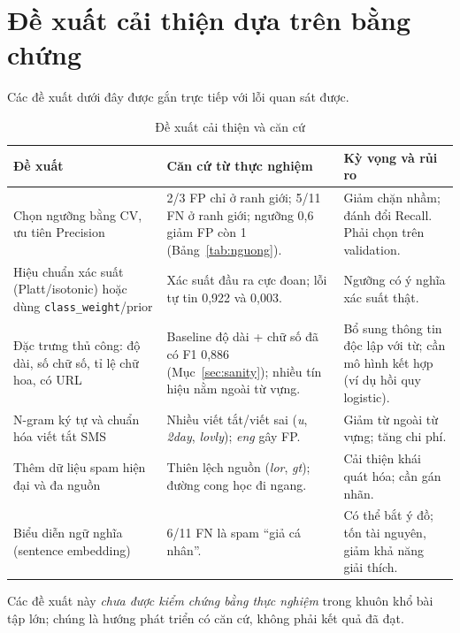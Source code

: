 \section{Đề xuất cải thiện dựa trên bằng chứng}

Các đề xuất dưới đây được gắn trực tiếp với lỗi quan sát được.

\begin{table}[H]
\centering
\caption{Đề xuất cải thiện và căn cứ}
\label{tab:de-xuat}
\small
\begin{tabular}{|p{3.7cm}|p{5.3cm}|p{5cm}|}
\hline
\textbf{Đề xuất} & \textbf{Căn cứ từ thực nghiệm} & \textbf{Kỳ vọng và rủi ro} \\
\hline
Chọn ngưỡng bằng CV, ưu tiên Precision & 2/3 FP chỉ ở ranh giới; 5/11 FN ở ranh giới; ngưỡng 0,6 giảm FP còn 1 (Bảng~\ref{tab:nguong}). & Giảm chặn nhầm; đánh đổi Recall. Phải chọn trên validation. \\
\hline
Hiệu chuẩn xác suất (Platt/isotonic) hoặc dùng \texttt{class\_weight}/prior & Xác suất đầu ra cực đoan; lỗi tự tin 0,922 và 0,003. & Ngưỡng có ý nghĩa xác suất thật. \\
\hline
Đặc trưng thủ công: độ dài, số chữ số, tỉ lệ chữ hoa, có URL & Baseline độ dài + chữ số đã có F1 0,886 (Mục~\ref{sec:sanity}); nhiều tín hiệu nằm ngoài từ vựng. & Bổ sung thông tin độc lập với từ; cần mô hình kết hợp (ví dụ hồi quy logistic). \\
\hline
N-gram ký tự và chuẩn hóa viết tắt SMS & Nhiều viết tắt/viết sai (\textit{u}, \textit{2day}, \textit{lovly}); \textit{eng} gây FP. & Giảm từ ngoài từ vựng; tăng chi phí. \\
\hline
Thêm dữ liệu spam hiện đại và đa nguồn & Thiên lệch nguồn (\textit{lor}, \textit{gt}); đường cong học đi ngang. & Cải thiện khái quát hóa; cần gán nhãn. \\
\hline
Biểu diễn ngữ nghĩa (sentence embedding) & 6/11 FN là spam ``giả cá nhân''. & Có thể bắt ý đồ; tốn tài nguyên, giảm khả năng giải thích. \\
\hline
\end{tabular}
\end{table}

Các đề xuất này \textit{chưa được kiểm chứng bằng thực nghiệm} trong khuôn khổ bài tập lớn; chúng là hướng phát triển có căn cứ, không phải kết quả đã đạt.
